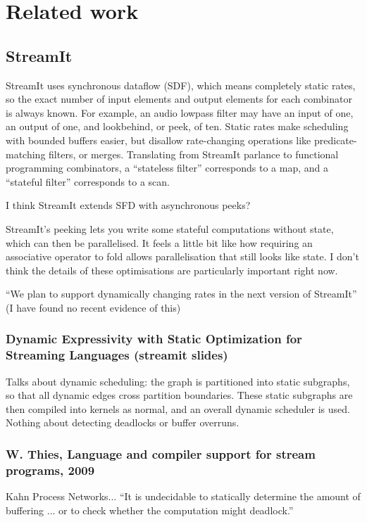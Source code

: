 \section{Related work}
\label{s:Related}

\subsection{StreamIt}
StreamIt\cite{thies2002streamit} uses synchronous dataflow (SDF), which means completely static rates, so the exact number of input elements and output elements for each combinator is always known.
For example, an audio lowpass filter may have an input of one, an output of one, and lookbehind, or peek, of ten.
Static rates make scheduling with bounded buffers easier, but disallow rate-changing operations like predicate-matching filters, or merges.
Translating from StreamIt parlance to functional programming combinators, a ``stateless filter'' corresponds to a map, and a ``stateful filter'' corresponds to a scan.

I think StreamIt extends SFD with asynchronous peeks?

StreamIt's peeking lets you write some stateful computations without state, which can then be parallelised.
It feels a little bit like how requiring an associative operator to fold allows parallelisation that still looks like state.
I don't think the details of these optimisations are particularly important right now.
\cite{gordon2010compiler}



``We plan to support dynamically changing rates in the next version of StreamIt''\cite{thies2002streamit} (I have found no recent evidence of this)

\subsubsection{Dynamic Expressivity with Static Optimization for Streaming Languages (streamit slides)}
Talks about dynamic scheduling: the graph is partitioned into static subgraphs, so that all dynamic edges cross partition boundaries. These static subgraphs are then compiled into kernels as normal, and an overall dynamic scheduler is used.
Nothing about detecting deadlocks or buffer overruns.

\subsubsection{W. Thies, Language and compiler support for stream programs, 2009}
Kahn Process Networks...
``It is undecidable to statically determine the amount of buffering ... or to check whether the computation might deadlock.''\cite{thies2009language}

